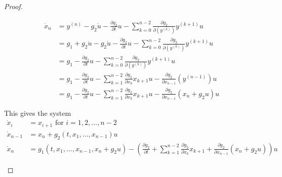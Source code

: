 \documentclass[12pt]{exam}
\renewenvironment{solution}%
{%
    \renewcommand{\proofname}{Solution}%
    \begin{proof}%
}{\end{proof}}
\theoremstyle{mytheoremstyle}
\begin{document}
\begin{solution}
\begin{enumerate}
    \begin{align*}
       \dot{x}_n &= y^{(n)} - g_2 \dot{u} - \frac{\partial g_2}{\partial t} u - \sum_{k=0}^{n-2} \frac{\partial g_2}{\partial ( y^{(k)})} y^{(k+1)} u\\
       &= g_1 + g_2 \dot{u} - g_2 \dot{u} - \frac{\partial g_2}{\partial t} u - \sum_{k=0}^{n-2} \frac{\partial g_2}{\partial ( y^{(k)})} y^{(k+1)} u \\
        &= g_1 - \frac{\partial g_2}{\partial t} u - \sum_{k=0}^{n-2} \frac{\partial g_2}{\partial ( y^{(k)})} y^{(k+1)} u \\
        &= g_1 - \frac{\partial g_2}{\partial t} u - \sum_{k=1}^{n-2} \frac{\partial g_2}{\partial x_{k} } x_{k+1} u - \frac{\partial g_2}{\partial x_{n-1}} ( y^{(n-1)} ) u \\
        &= g_1 - \frac{\partial g_2}{\partial t} u - \sum_{k=1}^{n-2} \frac{\partial g_2}{\partial x_{k} } x_{k+1} u - \frac{\partial g_2}{\partial x_{n-1}} ( x_n + g_2 u ) u
    \end{align*}
    
    This gives the system
    \begin{align*}
        \dot{x}_i &= x_{i+1} \text{ for } i = 1, 2, \dots, n-2 \\
        \dot{x}_{n-1} &= x_n + g_2(t, x_1, \dots, x_{n-1}) u\\
        \dot{x}_n &= g_1(t, x_1, \dots, x_{n-1}, x_n + g_2 u) - \left( \frac{\partial g_2}{\partial t} +\sum_{k=1}^{n-2} \frac{\partial g_2}{\partial x_{k} } x_{k+1} + \frac{\partial g_2}{\partial x_{n-1}} ( x_n + g_2 u ) \right) u
    \end{align*}
    \end{enumerate}
\end{solution}
\end{document}
